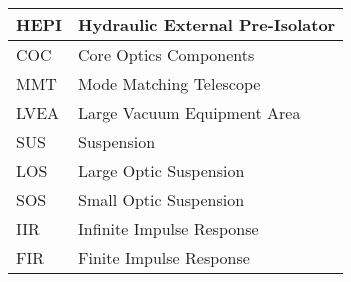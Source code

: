 \begin{table}[!h]
\begin{center}
\begin{tabular}{|l|l|}
HEPI               & Hydraulic External Pre-Isolator 		       \\ \hline

COC                & Core Optics Components			       \\ \hline
					      			       
MMT                & Mode Matching Telescope			       \\ \hline

LVEA               & Large Vacuum Equipment Area   		       \\ \hline
					      			       
SUS                & Suspension                                         \\ \hline

LOS                & Large Optic Suspension                             \\ \hline

SOS                & Small Optic Suspension                             \\ \hline

IIR                & Infinite Impulse Response                          \\ \hline

FIR                & Finite Impulse Response                            \\ \hline
								       		
\end{tabular}							      
\end{center}
\caption[Acronym Definitions]{}
\label{t:Acronyms}
\end{table}

